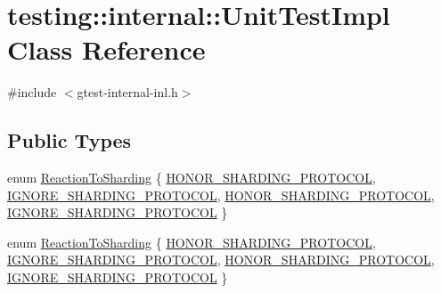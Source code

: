 \hypertarget{classtesting_1_1internal_1_1_unit_test_impl}{\section{testing\-:\-:internal\-:\-:Unit\-Test\-Impl Class Reference}
\label{classtesting_1_1internal_1_1_unit_test_impl}
}


{\ttfamily \#include $<$gtest-\/internal-\/inl.\-h$>$}

\subsection*{Public Types}
\begin{DoxyCompactItemize}
\item 
enum \hyperlink{classtesting_1_1internal_1_1_unit_test_impl_acc5ffd3f9bc2e87bb3dba4218f58af43}{Reaction\-To\-Sharding} \{ \hyperlink{classtesting_1_1internal_1_1_unit_test_impl_acc5ffd3f9bc2e87bb3dba4218f58af43a5b7dff4088f3130bed57552b4cc52d36}{H\-O\-N\-O\-R\-\_\-\-S\-H\-A\-R\-D\-I\-N\-G\-\_\-\-P\-R\-O\-T\-O\-C\-O\-L}, 
\hyperlink{classtesting_1_1internal_1_1_unit_test_impl_acc5ffd3f9bc2e87bb3dba4218f58af43ae105bbb59795c13603afe3957afb2812}{I\-G\-N\-O\-R\-E\-\_\-\-S\-H\-A\-R\-D\-I\-N\-G\-\_\-\-P\-R\-O\-T\-O\-C\-O\-L}, 
\hyperlink{classtesting_1_1internal_1_1_unit_test_impl_acc5ffd3f9bc2e87bb3dba4218f58af43a5b7dff4088f3130bed57552b4cc52d36}{H\-O\-N\-O\-R\-\_\-\-S\-H\-A\-R\-D\-I\-N\-G\-\_\-\-P\-R\-O\-T\-O\-C\-O\-L}, 
\hyperlink{classtesting_1_1internal_1_1_unit_test_impl_acc5ffd3f9bc2e87bb3dba4218f58af43ae105bbb59795c13603afe3957afb2812}{I\-G\-N\-O\-R\-E\-\_\-\-S\-H\-A\-R\-D\-I\-N\-G\-\_\-\-P\-R\-O\-T\-O\-C\-O\-L}
 \}
\item 
enum \hyperlink{classtesting_1_1internal_1_1_unit_test_impl_acc5ffd3f9bc2e87bb3dba4218f58af43}{Reaction\-To\-Sharding} \{ \hyperlink{classtesting_1_1internal_1_1_unit_test_impl_acc5ffd3f9bc2e87bb3dba4218f58af43a5b7dff4088f3130bed57552b4cc52d36}{H\-O\-N\-O\-R\-\_\-\-S\-H\-A\-R\-D\-I\-N\-G\-\_\-\-P\-R\-O\-T\-O\-C\-O\-L}, 
\hyperlink{classtesting_1_1internal_1_1_unit_test_impl_acc5ffd3f9bc2e87bb3dba4218f58af43ae105bbb59795c13603afe3957afb2812}{I\-G\-N\-O\-R\-E\-\_\-\-S\-H\-A\-R\-D\-I\-N\-G\-\_\-\-P\-R\-O\-T\-O\-C\-O\-L}, 
\hyperlink{classtesting_1_1internal_1_1_unit_test_impl_acc5ffd3f9bc2e87bb3dba4218f58af43a5b7dff4088f3130bed57552b4cc52d36}{H\-O\-N\-O\-R\-\_\-\-S\-H\-A\-R\-D\-I\-N\-G\-\_\-\-P\-R\-O\-T\-O\-C\-O\-L}, 
\hyperlink{classtesting_1_1internal_1_1_unit_test_impl_acc5ffd3f9bc2e87bb3dba4218f58af43ae105bbb59795c13603afe3957afb2812}{I\-G\-N\-O\-R\-E\-\_\-\-S\-H\-A\-R\-D\-I\-N\-G\-\_\-\-P\-R\-O\-T\-O\-C\-O\-L}
 \}
\end{DoxyCompactItemize}
